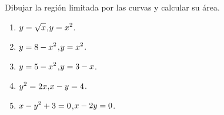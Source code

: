\item Dibujar la región limitada por las curvas y calcular su área.
\begin{multicols}{2}
  \begin{enumerate}
    \item $\displaystyle y= \sqrt x$,\quad $\displaystyle y= x^2$.
    \item $\displaystyle y= 8-x^2$,\quad $\displaystyle y= x^2 $.
    \item $\displaystyle y= 5-x^2$,\quad $\displaystyle y= 3-x $.
    \item $\displaystyle y^2=2x$,\quad $\displaystyle x-y=4  $.
    \item $\displaystyle x-y^2+3=0 $,\quad $\displaystyle x-2y=0  $.
  \end{enumerate}
  
\end{multicols}